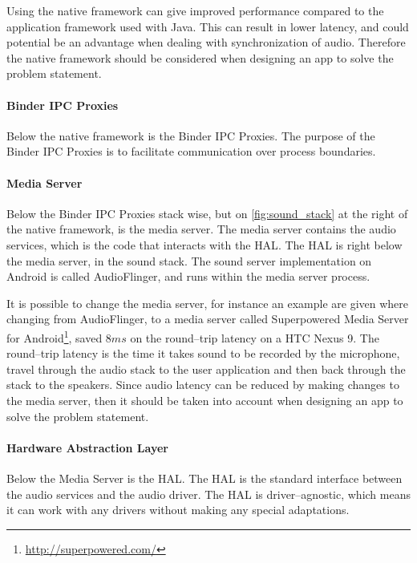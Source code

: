 Using the native framework can give improved performance compared to the application framework used with Java\cite{nat_perf_2}.
This can result in lower latency, and could potential be an advantage when dealing with synchronization of audio.
Therefore the native framework should be considered when designing an app to solve the problem statement.

\paragraph{Binder IPC Proxies}
Below the native framework is the Binder IPC Proxies.
The purpose of the Binder IPC Proxies is to facilitate communication over process boundaries.

\paragraph{Media Server}
Below the Binder IPC Proxies stack wise, but on \cref{fig:sound_stack} at the right of the native framework, is the media server.
The media server contains the audio services, which is the code that interacts with the \ac{HAL}.
The \ac{HAL} is right below the media server, in the sound stack.
The sound server implementation on Android is called AudioFlinger, and runs within the media server process\cite{audioflinger}.

It is possible to change the media server, 
for instance an example are given where changing from AudioFlinger, to a media server called Superpowered Media Server for Android\footnote{\url{http://superpowered.com/}}, saved $8 ms$ on the round--trip latency on a HTC Nexus 9\cite{superpowered_8ms}.
The round--trip latency is the time it takes sound to be recorded by the microphone,
travel through the audio stack to the user application and then back through the stack to the speakers\cite{superpowered_8ms}.
Since audio latency can be reduced by making changes to the media server,
then it should be taken into account when designing an app to solve the problem statement.

\paragraph{Hardware Abstraction Layer}
Below the Media Server is the \ac{HAL}.
The \ac{HAL} is the standard interface between the audio services and the audio driver.
The \ac{HAL} is driver--agnostic, which means it can work with any drivers without making any special adaptations.

